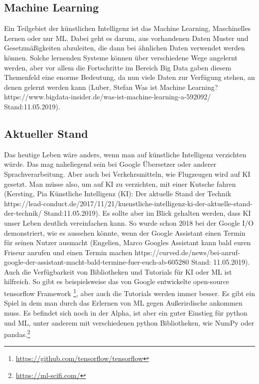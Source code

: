 \documentclass[12pt,a4paper]{article}
\begin{document}
	\subsection{Machine Learning}
	Ein Teilgebiet der künstlichen Intelligenz ist das Machine Learning, Maschinelles Lernen oder nur ML. Dabei geht es darum, aus vorhandenen Daten Muster und Gesetzmäßigkeiten abzuleiten, die dann bei ähnlichen Daten verwendet werden können. Solche lernenden Systeme können über verschiedene Wege angelernt werden, aber vor allem die Fortschritte im Bereich Big Data gaben diesem Themenfeld  eine enorme Bedeutung, da nun viele Daten zur Verfügung stehen, an denen gelernt werden kann (Luber, Stefan \glqq Was ist Machine Learning?\grqq{} https://www.bigdata-insider.de/was-ist-machine-learning-a-592092/ Stand:11.05.2019).
	\subsection{Aktueller Stand}
	Das heutige Leben wäre anders, wenn man auf künstliche Intelligenz verzichten würde. Das mag naheliegend sein bei Google Übersetzer oder anderer Sprachverarbeitung. Aber auch bei Verkehrsmitteln, wie Flugzeugen wird auf KI gesetzt. Man müsse also, um auf KI zu verzichten, mit einer Kutsche fahren (Kersting, Pia \glqq Künstliche Intelligenz (KI): Der aktuelle Stand der Technik\grqq{} https://lead-conduct.de/2017/11/21/kuenstliche-intelligenz-ki-der-aktuelle-stand-der-technik/ Stand:11.05.2019).
	Es sollte aber im Blick gehalten werden, dass KI unser Leben deutlich vereinfachen kann. So wurde schon 2018 bei der Google I/O demonstriert, wie es aussehen könnte, wenn der Google Assistant einen Termin für seinen Nutzer ausmacht (Engelien, Marco \glqq Googles Assistant kann bald euren Friseur anrufen und einen Termin machen\grqq{} https://curved.de/news/bei-anruf-google-der-assistant-macht-bald-termine-fuer-euch-ab-605280 Stand: 11.05.2019).
	Auch die Verfügbarkeit von Bibliotheken und Tutorials für KI oder ML ist hilfreich. So gibt es beispielsweise das von Google entwickelte open-source tensorflow Framework \footnote{\url{https://github.com/tensorflow/tensorflow}}, aber auch die Tutorials werden immer besser. Es gibt ein Spiel in dem man durch das Erlernen von ML gegen Außerirdische ankommen muss. Es befindet sich noch in der Alpha, ist aber ein guter Einstieg für python und ML, unter anderem mit verschiedenen python Bibliotheken, wie NumPy oder pandas.\footnote{\url{https://ml-scifi.com/}}
\end{document}
